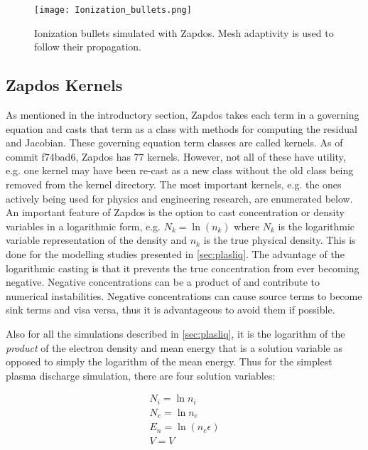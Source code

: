 \begin{figure}[htbp]
  \centering
  \texttt{[image: Ionization\_bullets.png]}
  \caption{Ionization bullets simulated with Zapdos. Mesh adaptivity is used to follow their propagation.}
  \label{fig:bullets}
\end{figure}

\subsection{Zapdos Kernels}
\label{sec:zap_kernels}

As mentioned in the introductory section, Zapdos takes each term in a governing equation and casts that term as a class with methods for computing the residual and Jacobian. These governing equation term classes are called kernels. As of commit f74bad6, Zapdos has 77 kernels. However, not all of these have utility, e.g. one kernel may have been re-cast as a new class without the old class being removed from the kernel directory. The most important kernels, e.g. the ones actively being used for physics and engineering research, are enumerated below. An important feature of Zapdos is the option to cast concentration or density variables in a logarithmic form, e.g. $N_k = \ln\left(n_k\right)$ where $N_k$ is the logarithmic variable representation of the density and $n_k$ is the true physical density. This is done for the modelling studies presented in \cref{sec:plasliq}. The advantage of the logarithmic casting is that it prevents the true concentration from ever becoming negative. Negative concentrations can be a product of and contribute to numerical instabilities. Negative concentrations can cause source terms to become sink terms and visa versa, thus it is advantageous to avoid them if possible.

Also for all the simulations described in \cref{sec:plasliq}, it is the logarithm of the \textit{product} of the electron density and mean energy that is a solution variable as opposed to simply the logarithm of the mean energy. Thus for the simplest plasma discharge simulation, there are four solution variables:

\begin{gather}\label{eq:soln_vars}
  N_i = \ln n_i\\
  N_e = \ln n_e\\
  E_n = \ln\left(n_e\epsilon\right)\\
  V = V
\end{gather}

